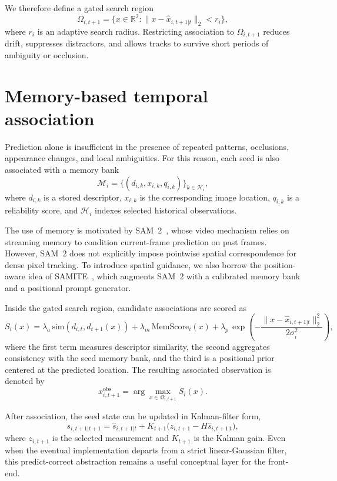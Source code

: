 \documentclass[11pt]{article}
\begin{document}
We therefore define a gated search region
\begin{equation}
 \Omega_{i,t+1} = \{x \in \mathbb{R}^2 : \|x-\hat{x}_{i,t+1|t}\|_2 < r_i\},
\end{equation}
where $r_i$ is an adaptive search radius. Restricting association to $\Omega_{i,t+1}$ reduces drift, suppresses distractors, and allows tracks to survive short periods of ambiguity or occlusion.

\section{Memory-based temporal association}
Prediction alone is insufficient in the presence of repeated patterns, occlusions, appearance changes, and local ambiguities. For this reason, each seed is also associated with a memory bank
\begin{equation}
 \mathcal{M}_i = \{(d_{i,k}, x_{i,k}, q_{i,k})\}_{k\in\mathcal{H}_i},
\end{equation}
where $d_{i,k}$ is a stored descriptor, $x_{i,k}$ is the corresponding image location, $q_{i,k}$ is a reliability score, and $\mathcal{H}_i$ indexes selected historical observations.

The use of memory is motivated by SAM~2~\cite{sam2_2024}, whose video mechanism relies on streaming memory to condition current-frame prediction on past frames. However, SAM~2 does not explicitly impose pointwise spatial correspondence for dense pixel tracking. To introduce spatial guidance, we also borrow the position-aware idea of SAMITE~\cite{samite2025}, which augments SAM~2 with a calibrated memory bank and a positional prompt generator.

Inside the gated search region, candidate associations are scored as
\begin{equation}
 S_i(x)=
 \lambda_a\,\mathrm{sim}(d_{i,t}, d_{t+1}(x))
 +\lambda_m\,\mathrm{MemScore}_i(x)
 +\lambda_p\,\exp\!\left(-\frac{\|x-\hat{x}_{i,t+1|t}\|_2^2}{2\sigma_i^2}\right),
\end{equation}
where the first term measures descriptor similarity, the second aggregates consistency with the seed memory bank, and the third is a positional prior centered at the predicted location. The resulting associated observation is denoted by
\begin{equation}
 x^{\mathrm{obs}}_{i,t+1} = \arg\max_{x \in \Omega_{i,t+1}} S_i(x).
\end{equation}

After association, the seed state can be updated in Kalman-filter form,
\begin{equation}
 s_{i,t+1|t+1} = \hat{s}_{i,t+1|t} + K_{t+1}\big(z_{i,t+1}-H\hat{s}_{i,t+1|t}\big),
\end{equation}
where $z_{i,t+1}$ is the selected measurement and $K_{t+1}$ is the Kalman gain. Even when the eventual implementation departs from a strict linear-Gaussian filter, this predict-correct abstraction remains a useful conceptual layer for the front-end.
\end{document}
